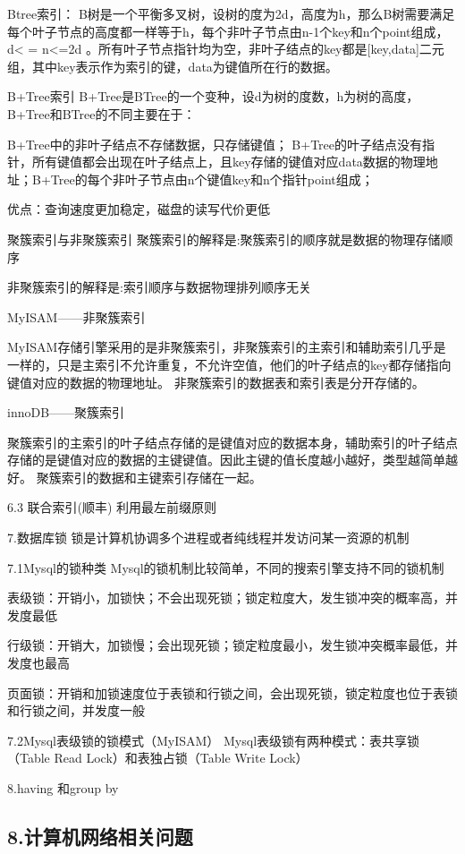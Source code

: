 \documentclass[UTF8]{ctexart}
\begin{document}
Btree索引：
B树是一个平衡多叉树，设树的度为2d，高度为h，那么B树需要满足每个叶子节点的高度都一样等于h，每个非叶子节点由n-1个key和n个point组成，d< = n<=2d 。所有叶子节点指针均为空，非叶子结点的key都是[key,data]二元组，其中key表示作为索引的键，data为键值所在行的数据。

B+Tree索引
B+Tree是BTree的一个变种，设d为树的度数，h为树的高度，B+Tree和BTree的不同主要在于：

B+Tree中的非叶子结点不存储数据，只存储键值；
B+Tree的叶子结点没有指针，所有键值都会出现在叶子结点上，且key存储的键值对应data数据的物理地址；B+Tree的每个非叶子节点由n个键值key和n个指针point组成；

优点：查询速度更加稳定，磁盘的读写代价更低

聚簇索引与非聚簇索引
聚簇索引的解释是:聚簇索引的顺序就是数据的物理存储顺序

非聚簇索引的解释是:索引顺序与数据物理排列顺序无关

MyISAM——非聚簇索引

MyISAM存储引擎采用的是非聚簇索引，非聚簇索引的主索引和辅助索引几乎是一样的，只是主索引不允许重复，不允许空值，他们的叶子结点的key都存储指向键值对应的数据的物理地址。
非聚簇索引的数据表和索引表是分开存储的。

innoDB——聚簇索引

聚簇索引的主索引的叶子结点存储的是键值对应的数据本身，辅助索引的叶子结点存储的是键值对应的数据的主键键值。因此主键的值长度越小越好，类型越简单越好。
聚簇索引的数据和主键索引存储在一起。

6.3 联合索引(顺丰)
利用最左前缀原则

7.数据库锁
锁是计算机协调多个进程或者纯线程并发访问某一资源的机制

7.1Mysql的锁种类
Mysql的锁机制比较简单，不同的搜索引擎支持不同的锁机制

表级锁：开销小，加锁快；不会出现死锁；锁定粒度大，发生锁冲突的概率高，并发度最低

行级锁：开销大，加锁慢；会出现死锁；锁定粒度最小，发生锁冲突概率最低，并发度也最高

页面锁：开销和加锁速度位于表锁和行锁之间，会出现死锁，锁定粒度也位于表锁和行锁之间，并发度一般

7.2Mysql表级锁的锁模式（MyISAM）
Mysql表级锁有两种模式：表共享锁（Table Read Lock）和表独占锁（Table Write Lock）

8.having 和group by

\subsection{8.计算机网络相关问题}
\end{document}

